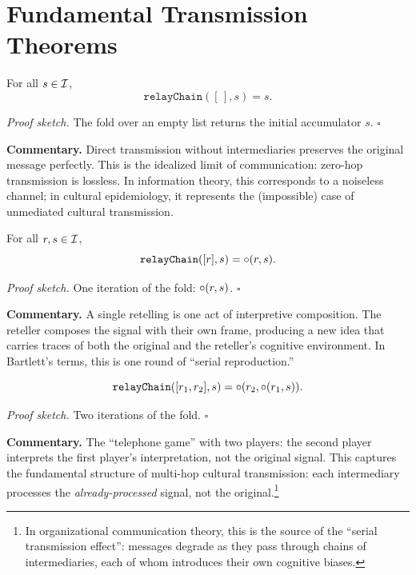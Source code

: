 \section{Fundamental Transmission Theorems}
\label{sec:ch18-fundamental}

\begin{theorem}
\label{thm:empty_chain_preserves}
For all $s \in \mathcal{I}$,
\[
  \texttt{relayChain}([\,], s) = s.
\]
\end{theorem}

\noindent\textit{Proof sketch.}\quad
The fold over an empty list returns the initial accumulator $s$.
\hfill$\square$

\medskip

\noindent\textbf{Commentary.}
Direct transmission without intermediaries preserves the original message
perfectly.  This is the idealized limit of communication: zero-hop
transmission is lossless.  In information theory, this corresponds to a
noiseless channel; in cultural epidemiology, it represents the (impossible)
case of unmediated cultural transmission.

\begin{theorem}[Singleton Chain = Single Composition (18.2)]
\label{thm:singleton_chain}
For all $r, s \in \mathcal{I}$,
\[
  \texttt{relayChain}([r], s) = \circ(r, s).
\]
\end{theorem}

\noindent\textit{Proof sketch.}\quad
One iteration of the fold: $\circ(r, s)$.
\hfill$\square$

\medskip

\noindent\textbf{Commentary.}
A single retelling is one act of interpretive composition.  The reteller
composes the signal with their own frame, producing a new idea that carries
traces of both the original and the reteller's cognitive environment.
In Bartlett's terms, this is one round of ``serial reproduction.''

\begin{theorem}
\label{thm:two_relayer_chain}
\[
  \texttt{relayChain}([r_1, r_2], s) = \circ(r_2, \circ(r_1, s)).
\]
\end{theorem}

\noindent\textit{Proof sketch.}\quad
Two iterations of the fold.
\hfill$\square$

\medskip

\noindent\textbf{Commentary.}
The ``telephone game'' with two players: the second player interprets the
first player's interpretation, not the original signal.  This captures the
fundamental structure of multi-hop cultural transmission: each intermediary
processes the \emph{already-processed} signal, not the original.\footnote{In
organizational communication theory, this is the source of the ``serial
transmission effect'': messages degrade as they pass through chains of
intermediaries, each of whom introduces their own cognitive biases.}

